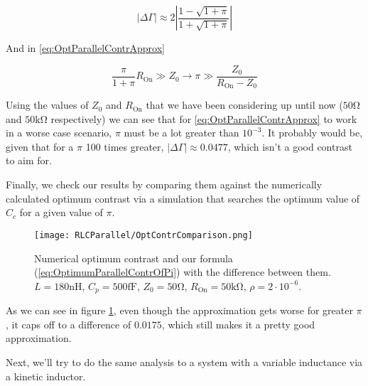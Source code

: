 \documentclass[../main.tex]{subfiles}
\begin{document}
\begin{equation}
\label{eq:OptimumParallelContrOfPi}
    |\Delta\Gamma| \approx
                   2\left|
                   \frac{1 - \sqrt{1 + \pi}}{1 + \sqrt{1 + \pi}}
                   \right|
\end{equation}

And in \ref{eq:OptParallelContrApprox}

\begin{equation}
\label{eq:OptParallelContrApproxOfPi}
\frac{\pi}{1 + \pi}R_{\text{On}} \gg Z_{0} \rightarrow
\pi \gg \frac{Z_{0}}{R_{\text{On}} - Z_{0}}
\end{equation}

Using the values of \(Z_{0}\) and \(R_{\text{On}}\) that we have been considering
up until now (\(50\unit{\ohm}\) and \(50\unit{\kilo\ohm}\) respectively) we can
see that for \ref{eq:OptParallelContrApprox} to work in a worse case scenario,
\(\pi\) must be a lot greater than \(10^{-3}\). It probably would
be, given that for a \(\pi\) 100 times greater,
\(|\Delta\Gamma| \approx 0.0477\), which isn't a good contrast to
aim for.

Finally, we check our results by comparing them against the numerically
calculated optimum contrast via a simulation that searches the optimum
value of \(C_{c}\) for a given value of \(\pi\).

\begin{figure}[htb]
\centering
  \texttt{[image: RLCParallel/OptContrComparison.png]}
  \caption{Numerical optimum contrast and our formula (\ref{eq:OptimumParallelContrOfPi})
  with the difference between them.
\(L = 180\unit{\nano\henry}\), \(C_{p} = 500\unit{\femto\farad}\),
\(Z_{0} = 50\unit{\ohm}\), \(R_{\text{On}} = 50\unit{\kilo\ohm}\),
\(\rho = 2\cdot10^{-6}\).}
\label{fig:ParallelContrComparison}
\end{figure}

As we can see in figure \ref{fig:ParallelContrComparison}, even though
the approximation gets worse for greater \(\pi\), it caps off to a difference of
\(0.0175\), which still makes it a pretty good approximation.

Next, we'll try to do the same analysis to a system with a variable inductance
via a kinetic inductor.
\end{document}
